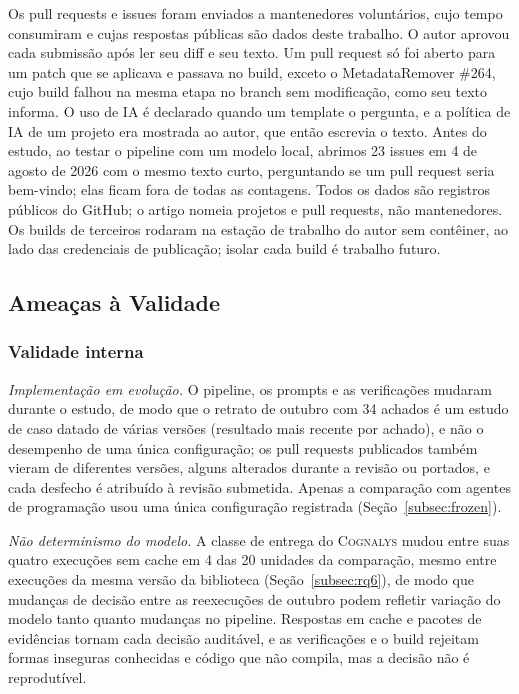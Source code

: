 \documentclass[conference]{IEEEtran}
\newcommand{\system}{\textsc{Cognalys}}
\begin{document}
Os pull requests e issues foram enviados a mantenedores voluntários, cujo tempo
consumiram e cujas respostas públicas são dados deste trabalho. O autor aprovou cada
submissão após ler seu diff e seu texto. Um pull request só foi aberto para
um patch que se aplicava e passava no build, exceto o MetadataRemover \#264, cujo build
falhou na mesma etapa no branch sem modificação, como seu texto informa. O uso de IA é declarado quando um
template o pergunta, e a política de IA de um projeto era mostrada ao autor, que então
escrevia o texto. Antes do estudo, ao testar o pipeline com um
modelo local, abrimos 23 issues em 4 de agosto de 2026 com o mesmo texto curto,
perguntando se um pull request seria bem-vindo; elas ficam fora de todas as contagens. Todos os dados são registros públicos do GitHub; o artigo
nomeia projetos e pull requests, não mantenedores. Os builds de terceiros rodaram na
estação de trabalho do autor sem contêiner, ao lado das credenciais de
publicação; isolar cada build é trabalho futuro.

\subsection{Ameaças à Validade}
\label{subsec:threats}

\subsubsection{Validade interna}

\emph{Implementação em evolução.} O pipeline, os prompts e as verificações mudaram durante
o estudo, de modo que o retrato de outubro com 34 achados é um estudo de caso datado de
várias versões (resultado mais recente por achado), e não o desempenho de uma única
configuração; os pull requests publicados também vieram de diferentes versões,
alguns alterados durante a revisão ou portados, e cada desfecho é atribuído à
revisão submetida. Apenas a comparação com agentes de
programação usou uma única configuração registrada (Seção~\ref{subsec:frozen}).

\emph{Não determinismo do modelo.} A classe de entrega do \system{} mudou entre suas
quatro execuções sem cache em 4 das 20 unidades da comparação, mesmo entre execuções da
mesma versão da biblioteca (Seção~\ref{subsec:rq6}), de modo que mudanças de decisão
entre as reexecuções de outubro podem refletir variação do modelo tanto quanto mudanças
no pipeline. Respostas em cache e pacotes de evidências tornam cada decisão
auditável, e as verificações e o build rejeitam formas inseguras conhecidas e código que
não compila, mas a decisão não é reprodutível.
\end{document}
